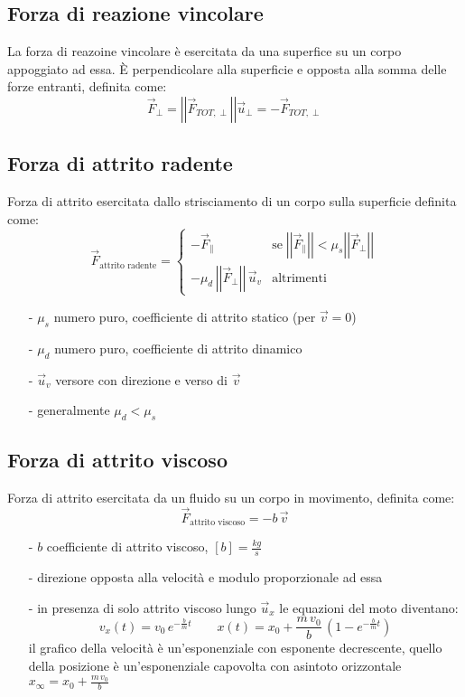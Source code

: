 \documentclass[a4paper]{article}
\newcommand\ux{\vec{u}_x}
\newcommand\vmod[1]{\left|\left|{#1}\right|\right|}
\begin{document}
\subsection{Forza di reazione vincolare}
La forza di reazoine vincolare è esercitata da una superfice su un corpo appoggiato ad essa. È perpendicolare alla superficie e
opposta alla somma delle forze entranti, definita come:
\[\vec{F}_\perp = \vmod{\vec{F}_{TOT,\perp}} \vec{u}_\perp = -\vec{F}_{TOT,\perp}\]

\subsection{Forza di attrito radente}
Forza di attrito esercitata dallo strisciamento di un corpo sulla superficie definita come:
\[\vec{F}_\text{attrito radente} = \begin{cases}
	-\vec{F}_{\parallel} &\text{se} \; \vmod{\vec{F}_\parallel} < \mu_s \vmod{\vec{F}_\perp}\\
	-\mu_d \, \vmod{\vec{F}_\perp} \, \vec{u}_v &\text{altrimenti}
\end{cases}\]

\begin{itemize}[topsep=3pt, itemsep=0pt]
	\item[-] \(\mu_s\) numero puro, coefficiente di attrito statico (per \(\vec{v}=0\))
	\item[-] \(\mu_d\) numero puro, coefficiente di attrito dinamico
	\item[-] \(\vec{u}_v\) versore con direzione e verso di \(\vec{v}\)
	\item[-] generalmente \(\mu_d < \mu_s\)
\end{itemize}

\subsection{Forza di attrito viscoso}
Forza di attrito esercitata da un fluido su un corpo in movimento, definita come:
\[\vec{F}_\text{attrito viscoso} = - b \, \vec{v}\]
\begin{itemize}[topsep=3pt, itemsep=0pt]
	\item[-] \(b\) coefficiente di attrito viscoso, \(\left[b\right] = \frac{kg}{s}\)
	\item[-] direzione opposta alla velocità e modulo proporzionale ad essa
	\item[-] in presenza di solo attrito viscoso lungo \(\ux\) le equazioni del moto diventano:
	\[v_x(t) = v_0 \, e^{-\frac{b}{m}t} \qquad x(t) = x_0 + \frac{m \, v_0}{b} \, \left(1-e^{-\frac{b}{m}t}\right)\]
	il grafico della velocità è un'esponenziale con esponente decrescente, quello della posizione è un'esponenziale capovolta con asintoto orizzontale \(x_{\infty} = x_0 + \frac{m \, v_0}{b}\)
\end{itemize}
\end{document}
